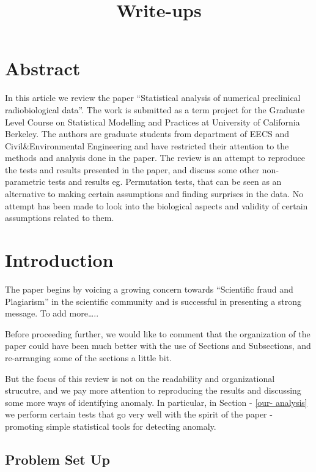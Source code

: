 \documentclass{article}
\title{Write-ups}
\begin{document}
    
    
    \maketitle
    
    

    
    \section{Abstract}\label{abstract}

In this article we review the paper ``Statistical analysis of numerical
preclinical radiobiological data''. The work is submitted as a term
project for the Graduate Level Course on Statistical Modelling and
Practices at University of California Berkeley. The authors are graduate
students from department of EECS and Civil\&Environmental Engineering
and have restricted their attention to the methods and analysis done in
the paper. The review is an attempt to reproduce the tests and results
presented in the paper, and discuss some other non-parametric tests and
results eg. Permutation tests, that can be seen as an alternative to
making certain assumptions and finding surprises in the data. No attempt
has been made to look into the biological aspects and validity of
certain assumptions related to them.

    \section{Introduction}\label{introduction}

The paper begins by voicing a growing concern towards ``Scientific fraud
and Plagiarism'' in the scientific community and is successful in
presenting a strong message. To add more\ldots{}..

Before proceeding further, we would like to comment that the
organization of the paper could have been much better with the use of
Sections and Subsections, and re-arranging some of the sections a little
bit.

But the focus of this review is not on the readability and
organizational strucutre, and we pay more attention to reproducing the
results and discussing some more ways of identifying anomaly. In
particular, in Section - \ref{our- analysis} we perform certain tests
that go very well with the spirit of the paper - promoting simple
statistical tools for detecting anomaly.

\subsection{Problem Set Up}\label{problem-set-up}
\end{document}
